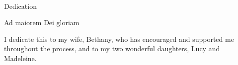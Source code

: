 

\renewcommand{\baselinestretch}{2}
\small\normalsize
\hbox{\ }

\vspace{-.65in}

\begin{center}
\large{Dedication}
\end{center}

\begin{center}
Ad maiorem Dei gloriam
\end{center}

\noindent I dedicate this to my wife, Bethany, who has encouraged and supported me throughout the process, and to my two wonderful daughters, Lucy and Madeleine.

